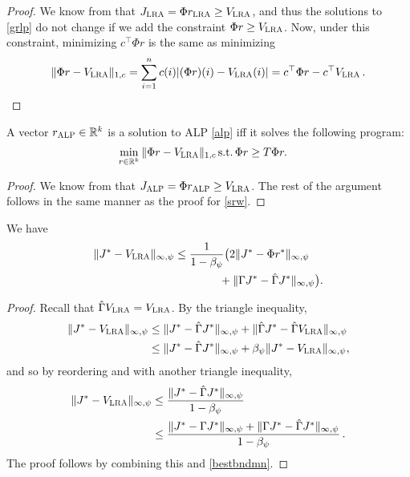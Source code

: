 \begin{proof}
We know from  that $J_{\text{\sc LRA}} = \Phi r_{\text{\sc LRA}} \geq V_{\text{\sc LRA}}$, and thus
the solutions to \eqref{grlp} do not change if we add the constraint $\Phi r \ge V_{\text{\sc LRA}}$.
Now, under this constraint, minimizing $c^\top \Phi r$ is the same as minimizing 
\begin{align*}
\|\Phi r-V_{\text{\sc LRA}}\|_{1,c}=\sum_{i=1}^n c(i) |(\Phi r)(i)-V_{\text{\sc LRA}}(i)|=c^\top \Phi r-c^\top V_{\text{\sc LRA}}\,.
\end{align*} 
\end{proof}
\begin{lemma}\label{srwalp}
A vector
$r_{\text{\sc ALP}} \in \mathbb{R}^k$ is a solution to ALP \eqref{alp} iff it solves the following program:
\begin{align}\label{grlpeqprog}
\begin{split}
\min_{r\in \Re^k}\, &\norm{\Phi r-\hv}_{1,c}\,\mb
\text{s.t.}\mb \, \Phi r\geq  T \Phi r.
\end{split}
\end{align}
\end{lemma}
\begin{proof}
We know from  that $J_{\text{\sc ALP}} = \Phi r_{\text{\sc ALP}} \geq V_{\text{\sc LRA}}$.
The rest of the argument follows in the same manner as the proof for \cref{srw}.
\end{proof}
\begin{lemma}\label{cmt1mn}
We have
\begin{align}
\|J^*-V_{\text{\sc LRA}}\|_{\infty,\psi}
& \leq \frac{1}{{1-\beta_{\psi}}}\big(2\|J^*-\Phi r^*\|_{\infty,\psi}
\nonumber\\
& {}\qquad \qquad+\|\Gamma J^*-\hat{\Gamma} J^*\|_{\infty,\psi}\big).
\end{align}
\end{lemma}
\begin{proof}
Recall that $\hat{\Gamma} V_{\text{\sc LRA}}=V_{\text{\sc LRA}}$. By the triangle inequality,
\begin{align*}
\|J^*-V_{\text{\sc LRA}}\|_{\infty,\psi}
& \leq \|J^*-\hat{\Gamma} J^*\|_{\infty,\psi}+\|\hat{\Gamma} J^*-\hat{\Gamma} V_{\text{\sc LRA}}\|_{\infty,\psi}\\
&\leq \|J^*-\hat{\Gamma} J^*\|_{\infty,\psi}+\beta_\psi \| J^*- V_{\text{\sc LRA}}\|_{\infty,\psi},
\end{align*}
and so by reordering and with another triangle inequality,
\begin{align*}%
\norm{J^*-\hv}_{\mn} \nn
&\le \frac{\norm{ J^*-\hg J^*}_{\mn}}{1-\beta_\psi}\nn\\
&\le \frac{\norm{ J^*-\Gamma J^*}_{\mn}+\norm{\Gamma J^* - \hg J^*}_{\mn}}{1-\beta_\psi}\,.
\end{align*}
The proof follows by combining this and \cref{bestbndmn}.
\end{proof}
